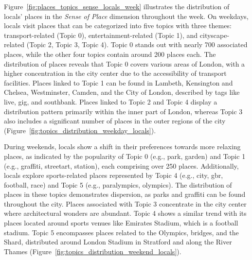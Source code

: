 \documentclass{article}
\theoremstyle{definition}
\theoremstyle{remark}
\begin{document}
Figure~\ref{fig:places_topics_sense_locals_week} illustrates the distribution of locals' places in the \textit{Sense of Place} dimension throughout the week. On weekdays, locals visit places that can be categorized into five topics with three themes: transport-related (Topic 0), entertainment-related (Topic 1), and cityscape-related (Topic 2, Topic 3, Topic 4). Topic 0 stands out with nearly 700 associated places, while the other four topics contain around 200 places each. The distribution of places reveals that Topic 0 covers various areas of London, with a higher concentration in the city center due to the accessibility of transport facilities. Places linked to Topic 1 can be found in Lambeth, Kensington and Chelsea, Westminster, Camden, and the City of London, described by tags like live, gig, and southbank. Places linked to Topic 2 and Topic 4 display a distribution pattern primarily within the inner part of London, whereas Topic 3 also includes a significant number of places in the outer regions of the city (Figure~\ref{fig:topics_distribution_weekday_locals}).

During weekends, locals show a shift in their preferences towards more relaxing places, as indicated by the popularity of Topic 0 (e.g., park, garden) and Topic 1 (e.g., graffiti, streetart, station), each comprising over 250 places. Additionally, locals explore sports-related places represented by Topic 4 (e.g., city, gbr, football, race) and Topic 5 (e.g., paralympics, olympics). The distribution of places in these topics demonstrates dispersion, as parks and graffiti can be found throughout the city. Places associated with Topic 3 concentrate in the city center where architectural wonders are abundant. Topic 4 shows a similar trend with its places located around sports venues like Emirates Stadium, which is a football stadium. Topic 5 encompasses places related to the Olympics, bridges, and the Shard, distributed around London Stadium in Stratford and along the River Thames (Figure~\ref{fig:topics_distribution_weekend_locals}).
\end{document}
